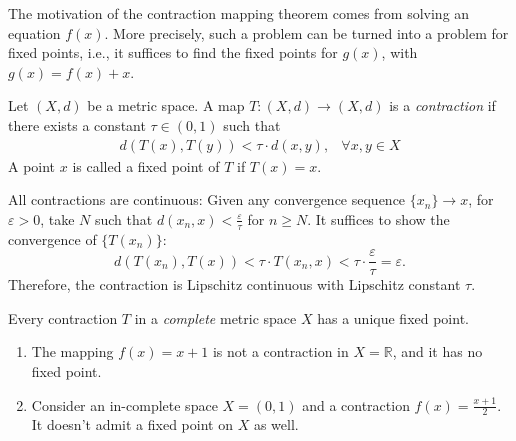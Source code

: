 The motivation of the contraction mapping theorem comes from solving an equation $f(x)$. More precisely, such a problem can be turned into a problem for fixed points, i.e., it suffices to find the fixed points for $g(x)$, with $g(x)=f(x)+x$.

\begin{definition}
Let $(X,d)$ be a metric space. 
A map $T:(X,d)\to (X,d)$ is a \emph{contraction} 
if there exists a constant $\tau\in(0,1)$ such that
\[
\begin{array}{ll}
d(T(x),T(y))<\tau\cdot d(x,y),
&
\forall x,y\in X
\end{array}
\]
A point $x$ is called a fixed point of $T$ if $T(x)=x$.
\end{definition}
\begin{remark}
All contractions are continuous: 
Given any convergence sequence $\{x_n\}\to x$, 
for $\varepsilon>0$, take $N$ such that 
$d(x_n,x)<\frac{\varepsilon}{\tau}$ for $n\ge N$. It suffices to show the convergence of $\{T(x_n)\}$:
\[
d(T(x_n),T(x))<\tau\cdot T(x_n,x)<\tau\cdot\frac{\varepsilon}{\tau}=\varepsilon.
\]
Therefore, the contraction is Lipschitz continuous with Lipschitz constant $\tau$.
\end{remark}

\begin{theorem}
Every contraction $T$ in a \emph{complete} metric space $X$ has a unique fixed point.
\end{theorem}

\begin{example}
\begin{enumerate}
\item
The mapping $f(x)=x+1$ is not a contraction in $X=\mathbb{R}$, and it has no fixed point.
\item
Consider an in-complete space $X=(0,1)$ and a contraction $f(x)=\frac{x+1}{2}$. It doesn't admit a fixed point on $X$ as well.
\end{enumerate}
\end{example}

